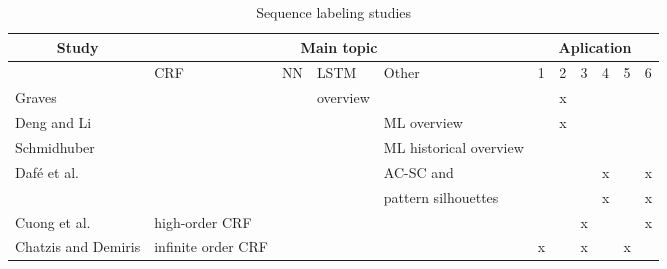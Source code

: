 \begin{landscape}
\begin{table}[!ht]
\caption{Sequence labeling studies}
\label{tab:sequencelabelingstudies}
\footnotesize
\begin{tabular}{l|l|l|l|l|l|l|l|l|l|l}

\multicolumn{1}{c|}{Study}                                  & \multicolumn{4}{c|}{Main topic}                                                   & \multicolumn{6}{c}{Aplication}                                        \\ \hline

                                                             & CRF                  & NN           & LSTM        & Other                         & 1         & 2 & 3 & 4 & 5 & 6 \\ \hline\hline
Graves \cite{graves_supervised_2012}                         &                      &              & overview    &                               &             & x      &             &         &        &                        \\ \hline
Deng and Li \cite{deng_machine_2013}                         &                      &              &             & ML overview                   &             & x      &             &         &        &                        \\ \hline
Schmidhuber \cite{schmidhuber_deep_2015}                     &                      &              &             & ML historical overview        &             &        &             &         &        &                        \\ \hline
\hline
Daf{\'e} et al. \cite{dafe_learning_2015}                    &                      &              &             & AC-SC and &             &        &             & x       &        & x                      \\ 
                    &                      &              &             & pattern silhouettes &             &        &             & x       &        & x                      \\ \hline
\hline
Cuong et al. \cite{cuong_conditional_2014}                   & high-order CRF       &              &             &                               &             &        & x           &         &        & x                      \\ \hline
Chatzis and Demiris \cite{chatzis_infinite-order_2013}       & infinite order CRF   &              &             &                               & x           &        & x           &         & x      &                        \\ \hline

\end{tabular}
\end{table}
\end{landscape}
